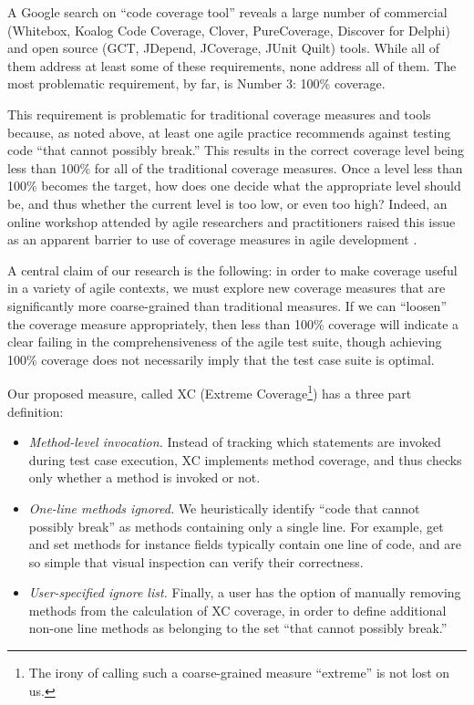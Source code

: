 \documentclass[10pt,twocolumn]{article}
\begin{document}
A Google search on ``code coverage tool'' reveals a large number of
commercial (Whitebox, Koalog Code Coverage, Clover, PureCoverage, Discover for
Delphi) and open source (GCT, JDepend, JCoverage, JUnit Quilt) tools. While all of them address
at least some of these requirements, none address all of them. The most
problematic requirement, by far, is Number 3: 100\% coverage.

This requirement is problematic for traditional coverage measures and tools
because, as noted above, at least one agile practice recommends against
testing code ``that cannot possibly break.'' This results in the correct
coverage level being less than 100\% for all of the traditional coverage
measures. Once a level less than 100\% becomes the target, how does one
decide what the appropriate level should be, and thus whether the current
level is too low, or even too high?  Indeed, an online workshop attended by
agile researchers and practitioners raised this issue as an apparent barrier to
use of coverage measures in agile development \cite{Costa03}.

A central claim of our research is the following: in order to make coverage
useful in a variety of agile contexts, we must explore new coverage
measures that are significantly more coarse-grained than traditional
measures. If we can ``loosen'' the coverage measure appropriately, then
less than 100\% coverage will indicate a clear failing in the
comprehensiveness of the agile test suite, though achieving 100\% coverage
does not necessarily imply that the test case suite is optimal.

Our proposed measure, called XC (Extreme Coverage\footnote{The irony of
calling such a coarse-grained measure ``extreme'' is not lost on us.}) has
a three part definition:

\begin{itemize}

\item {\em Method-level invocation.} Instead of tracking which statements
are invoked during test case execution, XC implements method coverage, and
thus checks only whether a method is
invoked or not.  

\item {\em One-line methods ignored.} We heuristically identify ``code that
cannot possibly break'' as methods containing only a single line. For
example, get and set methods for instance fields typically contain one line
of code, and are so simple that visual inspection can verify their
correctness.

\item {\em User-specified ignore list.} Finally, a user has the option of
manually removing methods from the calculation of XC coverage, in order to
define additional non-one line methods as belonging to the set ``that
cannot possibly break.''

\end{itemize}
\end{document}

